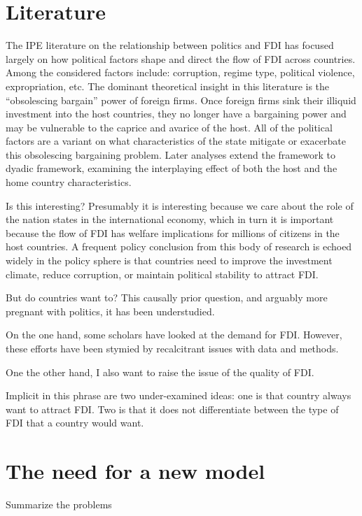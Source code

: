 \section{Literature}

The IPE literature on the relationship between politics and FDI has focused largely on how political factors shape and direct the flow of FDI across countries. Among the considered factors include: corruption, regime type, political violence, expropriation, etc. The dominant theoretical insight in this literature is the ``obsolescing bargain'' power of foreign firms. Once foreign firms sink their illiquid investment into the host countries, they no longer have a bargaining power and may be vulnerable to the caprice and avarice of the host. All of the political factors are a variant on what characteristics of the state mitigate or exacerbate this obsolescing bargaining problem.  Later analyses extend the framework to dyadic framework, examining the interplaying effect of both the host and the home country characteristics.

Is this interesting? Presumably it is interesting because we care about the role of the nation states in the international economy, which in turn it is important because the flow of FDI has welfare implications for millions of citizens in the host countries. A frequent policy conclusion from this body of research is echoed widely in the policy sphere is that countries need to improve the investment climate, reduce corruption, or maintain political stability to attract FDI.

But do countries want to? This causally prior question, and arguably more pregnant with politics, it has been understudied. 

On the one hand, some scholars have looked at the demand for FDI. However, these efforts have been stymied by recalcitrant issues with data and methods.

One the other hand, I also want to raise the issue of the quality of FDI.

Implicit in this phrase are two under-examined ideas: one is that country always want to attract FDI. Two is that it does not differentiate between the type of FDI that a country would want.

\section{The need for a new model}

Summarize the problems

